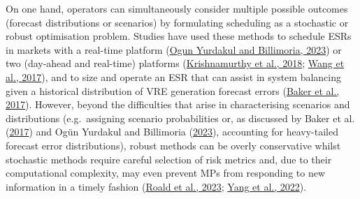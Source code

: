 \documentclass[12pt,a4paper,]{report}
\begin{document}
On one hand, operators can simultaneously consider multiple possible
outcomes (forecast distributions or scenarios) by formulating scheduling
as a stochastic or robust optimisation problem. Studies have used these
methods to schedule ESRs in markets with a real-time platform
(\protect\hyperlink{ref-yurdakulRiskAverseSelfSchedulingStorage2023}{Ogun
Yurdakul and Billimoria, 2023}) or two (day-ahead and real-time)
platforms
(\protect\hyperlink{ref-krishnamurthyEnergyStorageArbitrage2018}{Krishnamurthy
et al., 2018};
\protect\hyperlink{ref-wangOptimalSchedulingEnergy2017}{Wang et al.,
2017}), and to size and operate an ESR that can assist in system
balancing given a historical distribution of VRE generation forecast
errors (\protect\hyperlink{ref-bakerEnergyStorageSizing2017}{Baker et
al., 2017}). However, beyond the difficulties that arise in
characterising scenarios and distributions (e.g.~assigning scenario
probabilities or, as discussed by Baker et al.
(\protect\hyperlink{ref-bakerEnergyStorageSizing2017}{2017}) and Ogün
Yurdakul and Billimoria
(\protect\hyperlink{ref-yurdakulOnlineCompanionRiskAverse2023a}{2023}),
accounting for heavy-tailed forecast error distributions), robust
methods can be overly conservative whilst stochastic methods require
careful selection of risk metrics and, due to their computational
complexity, may even prevent MPs from responding to new information in a
timely fashion
(\protect\hyperlink{ref-roaldPowerSystemsOptimization2023}{Roald et al.,
2023}; \protect\hyperlink{ref-yangModellingOptimalEnergy2022}{Yang et
al., 2022}).
\end{document}
